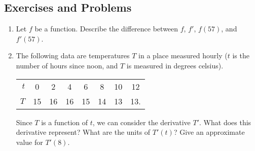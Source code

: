 \subsection{Exercises and Problems}
\begin{enumerate}
  \item Let $ f $ be a function. Describe the difference between $ f $, $ f' $, $ f(57) $, and $ f'(57) $.
  \item The following data are temperatures $ T $ in a place measured hourly ($ t $ is the number of hours since noon, and $ T $ is measured
        in degrees celsius).

        \begin{tabular}{r|ccccccc}
          $ t $ & 0 & 2 & 4 & 6 & 8 & 10 & 12\\
          $ T $ & 15 & 16 & 16 & 15 & 14 & 13 & 13.
        \end{tabular}

        Since $ T $ is a function of $ t $, we can consider the derivative $ T' $. What does this derivative represent?
        What are the units of $ T'(t) $? Give an approximate value for $ T'(8) $.


\end{enumerate}
